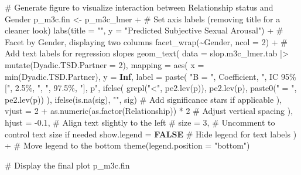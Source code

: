 \documentclass[
  bookmarksnumbered]{article}
\newenvironment{Shaded}{\begin{snugshade}}{\end{snugshade}}
\newcommand{\AttributeTok}[1]{\textcolor[rgb]{0.80,0.80,0.80}{#1}}
\newcommand{\CommentTok}[1]{\textcolor[rgb]{0.50,0.62,0.50}{#1}}
\newcommand{\ConstantTok}[1]{\textcolor[rgb]{0.86,0.64,0.64}{\textbf{#1}}}
\newcommand{\DecValTok}[1]{\textcolor[rgb]{0.86,0.86,0.80}{#1}}
\newcommand{\FloatTok}[1]{\textcolor[rgb]{0.75,0.75,0.82}{#1}}
\newcommand{\FunctionTok}[1]{\textcolor[rgb]{0.94,0.94,0.56}{#1}}
\newcommand{\NormalTok}[1]{\textcolor[rgb]{0.80,0.80,0.80}{#1}}
\newcommand{\OtherTok}[1]{\textcolor[rgb]{0.94,0.94,0.56}{#1}}
\newcommand{\SpecialCharTok}[1]{\textcolor[rgb]{0.86,0.64,0.64}{#1}}
\newcommand{\StringTok}[1]{\textcolor[rgb]{0.80,0.58,0.58}{#1}}
\begin{document}
\begin{Shaded}
\begin{Highlighting}[]
\CommentTok{\# Generate figure to visualize interaction between Relationship status and Gender}
\NormalTok{p\_m3c.fin }\OtherTok{\textless{}{-}}\NormalTok{ p\_m3c\_lmer }\SpecialCharTok{+}
  \CommentTok{\# Set axis labels (removing title for a cleaner look)}
  \FunctionTok{labs}\NormalTok{(}\AttributeTok{title =} \StringTok{""}\NormalTok{, }\AttributeTok{y =} \StringTok{"Predicted Subjective Sexual Arousal"}\NormalTok{) }\SpecialCharTok{+}
  \CommentTok{\# Facet by Gender, displaying two columns}
  \FunctionTok{facet\_wrap}\NormalTok{(}\SpecialCharTok{\textasciitilde{}}\NormalTok{Gender, }\AttributeTok{ncol =} \DecValTok{2}\NormalTok{) }\SpecialCharTok{+}
  \CommentTok{\# Add text labels for regression slopes}
  \FunctionTok{geom\_text}\NormalTok{(}
    \AttributeTok{data =}\NormalTok{ slop.m3c\_lmer.tab }\SpecialCharTok{|\textgreater{}} \FunctionTok{mutate}\NormalTok{(}\AttributeTok{Dyadic.TSD.Partner =} \DecValTok{2}\NormalTok{),}
    \AttributeTok{mapping =} \FunctionTok{aes}\NormalTok{(}
      \AttributeTok{x =} \FunctionTok{min}\NormalTok{(Dyadic.TSD.Partner), }\AttributeTok{y =} \ConstantTok{Inf}\NormalTok{,}
      \AttributeTok{label =} \FunctionTok{paste}\NormalTok{(}
        \StringTok{"B = "}\NormalTok{, Coefficient, }\StringTok{", IC 95\%["}\NormalTok{, }\StringTok{\textasciigrave{}}\AttributeTok{2.5\%}\StringTok{\textasciigrave{}}\NormalTok{, }\StringTok{", "}\NormalTok{, }\StringTok{\textasciigrave{}}\AttributeTok{97.5\%}\StringTok{\textasciigrave{}}\NormalTok{, }\StringTok{"], p"}\NormalTok{,}
        \FunctionTok{ifelse}\NormalTok{(}
          \FunctionTok{grepl}\NormalTok{(}\StringTok{"\textless{}"}\NormalTok{, }\FunctionTok{pe2.lev}\NormalTok{(p)), }\FunctionTok{pe2.lev}\NormalTok{(p), }\FunctionTok{paste0}\NormalTok{(}\StringTok{" = "}\NormalTok{, }\FunctionTok{pe2.lev}\NormalTok{(p))}
\NormalTok{        ),}
        \FunctionTok{ifelse}\NormalTok{(}\FunctionTok{is.na}\NormalTok{(sig), }\StringTok{""}\NormalTok{, sig) }\CommentTok{\# Add significance stars if applicable}
\NormalTok{      ),}
      \AttributeTok{vjust =} \DecValTok{2} \SpecialCharTok{+} \FunctionTok{as.numeric}\NormalTok{(}\FunctionTok{as.factor}\NormalTok{(Relationship)) }\SpecialCharTok{*} \DecValTok{2} \CommentTok{\# Adjust vertical spacing}
\NormalTok{    ),}
    \AttributeTok{hjust =} \SpecialCharTok{{-}}\FloatTok{0.1}\NormalTok{, }\CommentTok{\# Align text slightly to the left}
    \CommentTok{\# size = 3,  \# Uncomment to control text size if needed}
    \AttributeTok{show.legend =} \ConstantTok{FALSE} \CommentTok{\# Hide legend for text labels}
\NormalTok{  ) }\SpecialCharTok{+}
  \CommentTok{\# Move legend to the bottom}
  \FunctionTok{theme}\NormalTok{(}\AttributeTok{legend.position =} \StringTok{"bottom"}\NormalTok{)}

\CommentTok{\# Display the final plot}
\NormalTok{p\_m3c.fin}
\end{Highlighting}
\end{Shaded}
\end{document}
